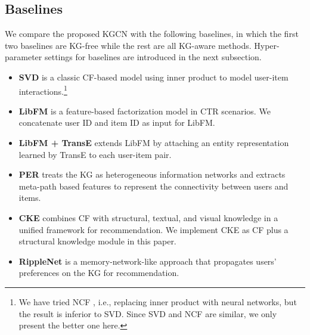 \documentclass[sigconf]{acmart}
\begin{document}
		
	\subsection{Baselines}
		We compare the proposed KGCN with the following baselines, in which the first two baselines are KG-free while the rest are all KG-aware methods.
		Hyper-parameter settings for baselines are introduced in the next subsection.
		\begin{itemize}
			\item
				\textbf{SVD} \cite{koren2008factorization} is a classic CF-based model using inner product to model user-item interactions.\footnote{We have tried NCF \cite{he2017neural}, i.e., replacing inner product with neural networks, but the result is inferior to SVD. Since SVD and NCF are similar, we only present the better one here.}
			\item
				\textbf{LibFM} \cite{rendle2012factorization} is a feature-based factorization model in CTR scenarios.
				We concatenate user ID and item ID as input for LibFM.
			\item
				\textbf{LibFM + TransE} extends LibFM by attaching an entity representation learned by TransE \cite{bordes2013translating} to each user-item pair.
\item
				\textbf{PER} \cite{yu2014personalized} treats the KG as heterogeneous information networks and extracts meta-path based features to represent the connectivity between users and items.
			\item
				\textbf{CKE} \cite{zhang2016collaborative} combines CF with structural, textual, and visual knowledge in a unified framework for recommendation.
				We implement CKE as CF plus a structural knowledge module in this paper.
			\item
				\textbf{RippleNet} \cite{wang2018ripple} is a memory-network-like approach that propagates users' preferences on the KG for recommendation.
		\end{itemize}
	
	\iffalse
	\begin{figure}[t]
		\centering
        \begin{subfigure}[b]{0.22\textwidth}
            \texttt{[image: charts/es\_1.eps]}
            \caption{MovieLens-20M}
            \label{fig:es_1}
        \end{subfigure}
        \hfill
        \begin{subfigure}[b]{0.22\textwidth}
            \texttt{[image: charts/es\_2.eps]}
            \caption{Last.FM}
            \label{fig:es_2}
        \end{subfigure}
        \caption{Probability distribution of the shortest distance between two randomly sampled items in the KG under the circumstance that (1) they have no common rater in the dataset; (2) they have common rater(s) in the dataset.}
        \label{fig:es}
    \end{figure}
    \fi
		
\end{document}
